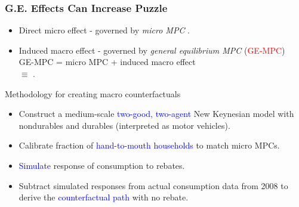 \documentclass[english,xcolor=svgnames]{beamer}
\begin{document}
\begin{frame}
\frametitle[alignment=center]{G.E. Effects Can Increase Puzzle }
\begin{itemize}

	\item Direct micro effect - governed by \textit{micro MPC} .
\item Induced macro effect - governed by \textit{general equilibrium MPC} (\textcolor{red}{GE-MPC}) \hspace{.05in} \\ \vspace{.2in}
\indent GE-MPC \hspace{.05in} = \hspace{.05in} micro MPC \hspace{.05in} + \hspace{.05in} induced macro effect \hspace{.05in} \\ \medskip
\indent \hspace{0.62in}  $\equiv$ \hspace{.05in} .


\end{itemize}



\end{frame}

\begin{frame}{Methodology for creating macro counterfactuals}
\vspace{.1in}

  \begin{itemize}\itemsep=4ex
  \item Construct a medium-scale \textcolor{blue}{two-good, two-agent} New Keynesian model with nondurables and durables (interpreted as motor vehicles).
  \item Calibrate fraction of \textcolor{blue}{hand-to-mouth households} to match micro MPCs.
  \item \textcolor{blue}{Simulate} response of consumption to rebates.
  \item Subtract simulated responses from actual consumption data  from 2008 to derive the \textcolor{blue}{counterfactual path} with no rebate.
  \end{itemize}
\end{frame}
\end{document}
